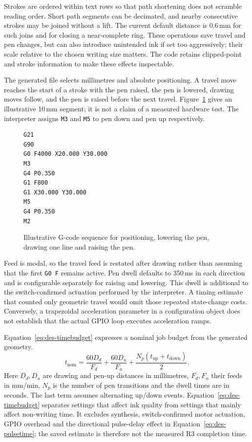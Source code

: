 Strokes are ordered within text rows so that path shortening does not scramble reading order. Short path segments can be decimated, and nearby consecutive strokes may be joined without a lift. The current default distance is 0.6\,mm for such joins and for closing a near-complete ring. These operations save travel and pen changes, but can also introduce unintended ink if set too aggressively; their scale relative to the chosen writing size matters. The code retains clipped-point and stroke information to make these effects inspectable.

The generated file selects millimetres and absolute positioning. A travel move reaches the start of a stroke with the pen raised, the pen is lowered, drawing moves follow, and the pen is raised before the next travel. Figure~\ref{fig:des-gcode-excerpt} gives an illustrative 10\,mm segment; it is not a claim of a measured hardware test. The interpreter assigns \texttt{M3} and \texttt{M5} to pen down and pen up respectively.
\begin{figure}[!htbp]
\begin{lstlisting}[style=designcode]
G21
G90
G0 F4000 X20.000 Y30.000
M3
G4 P0.350
G1 F800
G1 X30.000 Y30.000
M5
G4 P0.350
M2
\end{lstlisting}
\caption{Illustrative G-code sequence for positioning, lowering the pen, drawing one line and raising the pen.}
\label{fig:des-gcode-excerpt}
\end{figure}

Feed is modal, so the travel feed is restated after drawing rather than assuming that the first \texttt{G0 F} remains active. Pen dwell defaults to 350\,ms in each direction and is configurable separately for raising and lowering. This dwell is additional to the switch-confirmed actuation performed by the interpreter. A timing estimate that counted only geometric travel would omit those repeated state-change costs. Conversely, a trapezoidal acceleration parameter in a configuration object does not establish that the actual GPIO loop executes acceleration ramps.

Equation~\ref{eq:des-timebudget} expresses a nominal job budget from the generated geometry.
\begin{equation}
t_{\mathrm{nom}}=\frac{60D_d}{F_d}+\frac{60D_u}{F_u}
+\frac{N_p(t_{\mathrm{up}}+t_{\mathrm{down}})}{2}.
\label{eq:des-timebudget}
\end{equation}
Here $D_d,D_u$ are drawing and pen-up distances in millimetres, $F_d,F_u$ their feeds in mm/min, $N_p$ is the number of pen transitions and the dwell times are in seconds. The last term assumes alternating up/down events. Equation~\ref{eq:des-timebudget} separates settings that affect ink quality from settings that mainly affect non-writing time. It excludes synthesis, switch-confirmed motor actuation, GPIO overhead and the directional pulse-delay effect in Equation~\ref{eq:des-pulsetime}; the saved estimate is therefore not the measured R3 completion time.


